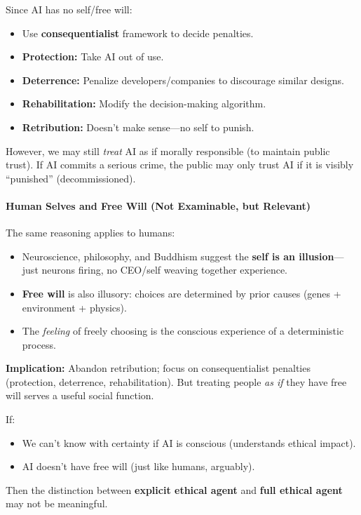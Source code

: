\begin{tipbox}
Since AI has no self/free will:
\begin{itemize}
  \item Use \textbf{consequentialist} framework to decide penalties.
  \item \textbf{Protection:} Take AI out of use.
  \item \textbf{Deterrence:} Penalize developers/companies to discourage similar designs.
  \item \textbf{Rehabilitation:} Modify the decision-making algorithm.
  \item \textbf{Retribution:} Doesn't make sense---no self to punish.
\end{itemize}

However, we may still \textit{treat} AI as if morally responsible (to maintain public trust). If AI commits a serious crime, the public may only trust AI if it is visibly ``punished'' (decommissioned).
\end{tipbox}

\separator

\paragraph*{Human Selves and Free Will (Not Examinable, but Relevant)}

\begin{keybox}
The same reasoning applies to humans:
\begin{itemize}
  \item Neuroscience, philosophy, and Buddhism suggest the \textbf{self is an illusion}---just neurons firing, no CEO/self weaving together experience.
  \item \textbf{Free will} is also illusory: choices are determined by prior causes (genes + environment + physics).
  \item The \textit{feeling} of freely choosing is the conscious experience of a deterministic process.
\end{itemize}

\textbf{Implication:} Abandon retribution; focus on consequentialist penalties (protection, deterrence, rehabilitation). But treating people \textit{as if} they have free will serves a useful social function.
\end{keybox}

\begin{thmbox}
If:
\begin{itemize}
  \item We can't know with certainty if AI is conscious (understands ethical impact).
  \item AI doesn't have free will (just like humans, arguably).
\end{itemize}
Then the distinction between \textbf{explicit ethical agent} and \textbf{full ethical agent} may not be meaningful.
\end{thmbox}

